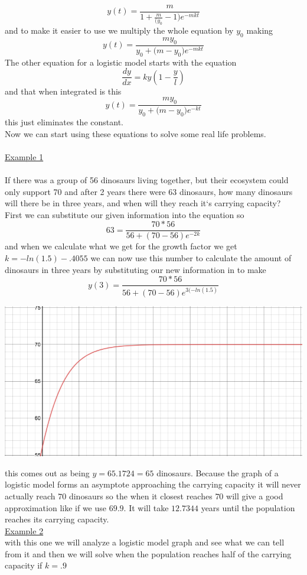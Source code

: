 \documentclass[a4paper,openright, 10pt]{article}
\begin{document}
  $$y(t)=\frac{m}{1+\frac{m}{(y_0}-1)e^{-mkt}}$$
  and to make it easier to use we multiply the whole equation by $y_0$ making
    $$y(t)=\frac{{my_0}}{{y_0+(m-y_0})e^{-mkt}}$$
    The other equation for a logistic model starts with the equation
$$\frac{dy}{dx}=ky(1-\frac{y}{l})$$ and that when integrated is this 
$$y(t)=\frac{{my_0}}{{y_0+(m-y_0})e^{-kt}}$$ this just eliminates the constant.
 \\Now we can start using these equations to solve some real life problems.\\
 \\
  \underline{Example 1}\\
 \\If there was a group of 56 dinosaurs living together, but their ecosystem could only support 70 and after 2 years there were 63 dinosaurs, how many dinosaurs will there be in three years, and when will they reach it‘s carrying capacity?
 \\First we can substitute our given information into the equation so $$63=\frac{70*56}{56+(70-56)e^{-2k}}$$ and when we calculate what we get for the growth factor we get $k=-ln(1.5)-.4055$ we can now use this number to calculate the amount of dinosaurs in three years by substituting our new information in to make $$y(3)=\frac{70*56}{56+(70-56)e^{3(-ln(1.5)}}$$ 
  \begin{center}
    

\includegraphics[width = 10 cm, height = 5 cm]{chicken.png}
\end{center}
 this comes out as being $y=65.1724=65$ dinosaurs. Because the graph of a logistic model forms an asymptote approaching the carrying capacity it will never actually reach $70$ dinosaurs so the when it closest reaches $70$ will give a good approximation like if we use $69.9$. It will take $12.7344$ years until the population reaches its carrying capacity.
 \\
 \underline{Example 2}\\ with this one we will analyze a logistic model graph and see what we can tell from it and then we will solve when the population reaches half of the carrying capacity if $k=.9$
\end{document}
